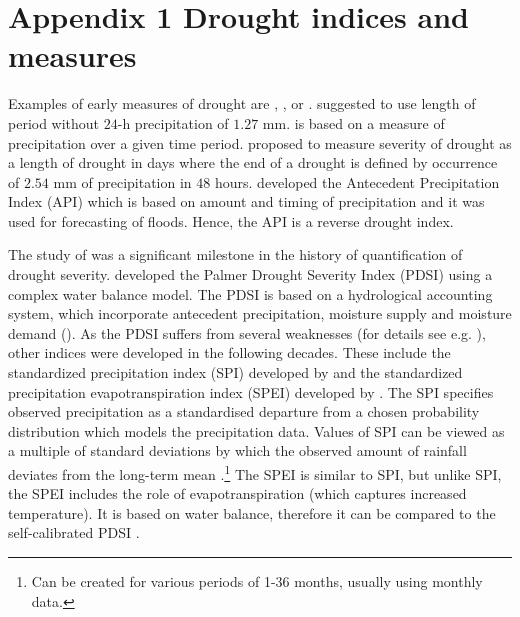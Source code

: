 \documentclass[a4paper,12pt]{article}
\begin{document}

\makeatletter 
\renewcommand{\thesection}{\hspace*{-1.0em}}
\newpage
\linespread{1}

%


\newpage


\setcounter{table}{0} 
\makeatletter 
\renewcommand{\thetable}{A\@arabic \c@table} 
\FloatBarrier


\section{Appendix 1 Drought indices and measures}

Examples of early measures of drought are \cite{wilhite1985}, \cite{munger1916}, \cite{blumenstock1942} or \cite{mcquigg1954}. \cite{munger1916} suggested to use length of period without $24$-h precipitation of $1.27$ mm. \cite{wilhite1985} is based on a measure of precipitation over a given time period. \cite{blumenstock1942} proposed to measure severity of drought as a length of drought in days where the end of a drought is defined by occurrence of $2.54$ mm of precipitation in $48$ hours. \cite{mcquigg1954} developed the Antecedent Precipitation Index (API) which is based on amount and timing of precipitation and it was used for forecasting of floods. Hence, the API is a reverse drought index.

The study of \cite{palmer1965} was a significant milestone in the history of quantification of drought severity. \cite{palmer1965} developed the Palmer Drought Severity Index (PDSI) using a complex water balance model. The PDSI is based on a hydrological accounting system, which incorporate antecedent precipitation, moisture supply and moisture demand (\citealp{Heim2002,palmer1965}). As the PDSI suffers from several weaknesses (for details see e.g. \citealt{Heim2002}), other indices were developed in the following decades. These include the standardized precipitation index (SPI) developed by \cite{SPI} and the standardized precipitation evapotranspiration index (SPEI) developed by \cite{SPEI}. The SPI specifies observed precipitation as a standardised departure from a chosen probability distribution which models the precipitation data. Values of SPI can be viewed as a multiple of standard deviations by which the observed amount of rainfall deviates from the long-term mean \citep{SPIonline}.\footnote{Can be created for various periods of 1-36 months, usually using monthly data.} The SPEI is similar to SPI, but unlike SPI, the SPEI includes the role of evapotranspiration (which captures increased temperature). It is based on water balance, therefore it can be compared to the self-calibrated PDSI \citep{SPEI}. 
\end{document}
